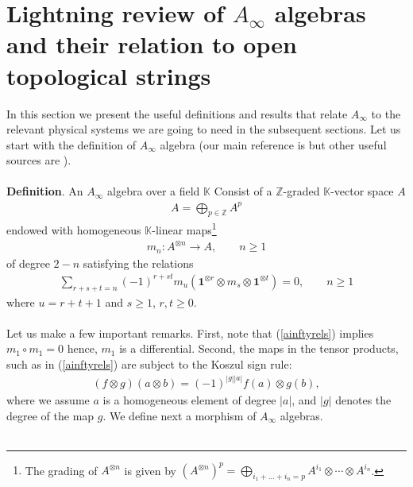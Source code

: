 \documentclass[a4paper,11pt]{article}
\numberwithin{equation}{section}
\begin{document}
\section{\label{sec:LGAinf}Lightning review of $A_{\infty}$ algebras and their 
relation to open topological strings}

In this section we present the useful definitions and results that relate 
$A_{\infty}$ to the relevant physical systems we are going to need in the 
subsequent sections. Let us start with the definition of $A_{\infty}$ algebra 
(our main reference is \cite{keller2001introduction} but other useful 
sources are \cite{stasheff86,penkava1994a,lefevre2003infini}). 
\\\\
\textbf{Definition}. An $A_{\infty}$ algebra over a field $\mathbb{K}$ Consist 
of a $\mathbb{Z}$-graded $\mathbb{K}$-vector space $A$
\begin{eqnarray}
A=\bigoplus_{p\in\mathbb{Z}}A^{p}
\end{eqnarray}
endowed with homogeneous $\mathbb{K}$-linear maps\footnote{The grading of 
$A^{\otimes n}$ is given by $(A^{\otimes 
n})^{p}=\bigoplus_{i_{1}+\ldots+i_{n}=p}A^{i_{1}}\otimes\cdots\otimes 
A^{i_{n}}$.}
\begin{eqnarray}
m_{n}:A^{\otimes n}\rightarrow A,\qquad n\geq 1
\end{eqnarray}
of degree $2-n$ satisfying the relations
\begin{eqnarray}\label{ainftyrels}
\sum_{r+s+t=n}(-1)^{r+st}m_{u}(\mathbf{1}^{\otimes r}\otimes m_{s}\otimes 
\mathbf{1}^{\otimes t})=0,\qquad n\geq 1
\end{eqnarray}
where $u=r+t+1$ and $s\geq 1$, $r,t\geq 0$.
\\\\
Let us make a few important remarks. First, note that (\ref{ainftyrels}) 
implies $m_{1}\circ m_{1}=0$ hence, $m_{1}$ is a differential. Second, the maps 
in the tensor products, such as in (\ref{ainftyrels}) are subject to the 
Koszul sign rule:
\begin{eqnarray}
(f\otimes g)(a\otimes b)=(-1)^{|g||a|}f(a)\otimes g(b),
\end{eqnarray}
where we assume $a$ is a homogeneous element of degree $|a|$, and 
$|g|$ denotes the degree of the map $g$. We define next a morphism of 
$A_{\infty}$ algebras.
\\\\
\end{document}
